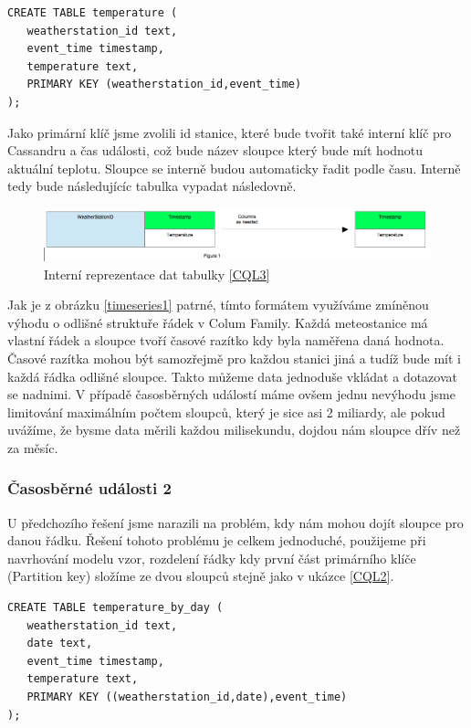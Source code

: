 \documentclass[thesis=M,czech]{FITthesis}[2012/06/26]
\begin{document}
\begin{lstlisting}[caption={Dynamická tabulka 1},label=CQL3]
CREATE TABLE temperature (
   weatherstation_id text,
   event_time timestamp,
   temperature text,
   PRIMARY KEY (weatherstation_id,event_time)
);
\end{lstlisting}

Jako primární klíč jsme zvolili id stanice, které bude tvořit také interní klíč pro Cassandru a čas události, což bude název sloupce který bude mít hodnotu aktuální teplotu. Sloupce se interně budou automaticky řadit podle času. Interně tedy bude následujícíc tabulka vypadat následovně. 

\begin{figure}[h]
\centering
\includegraphics[scale=0.4]{images/timeseries1}
\caption{Interní reprezentace dat tabulky \ref{CQL3}}
\label{fig:timeseries1}
\end{figure}

Jak je z obrázku \ref{timeseries1} patrné, tímto formátem využíváme zmíněnou výhodu o odlišné struktuře řádek v Colum Family. Každá meteostanice má vlastní řádek a sloupce tvoří časové razítko kdy byla naměřena daná hodnota. Časové razítka mohou být samozřejmě pro každou stanici jiná a tudíž bude mít i každá řádka odlišné sloupce. Takto můžeme data jednoduše vkládat a dotazovat se nadnimi. V případě časosběrných událostí máme ovšem jednu nevýhodu jsme limitování maximálním počtem sloupců, který je sice asi 2 miliardy, ale pokud uvážíme, že bysme data měrili každou milisekundu, dojdou nám sloupce dřív než za měsíc.  

\subsubsection*{Časosběrné události 2}
U předchozího řešení jsme narazili na problém, kdy nám mohou dojít sloupce pro danou řádku. Řešení tohoto problému je celkem jednoduché, použijeme při navrhování modelu vzor, rozdelení řádky kdy první část primárního klíče (Partition key) složíme ze dvou sloupců stejně jako v ukázce \ref{CQL2}.


\begin{lstlisting}[caption={Dynamická tabulka 2},label=CQL4]
CREATE TABLE temperature_by_day (
   weatherstation_id text,
   date text,
   event_time timestamp,
   temperature text,
   PRIMARY KEY ((weatherstation_id,date),event_time)
);
\end{lstlisting}
\end{document}
